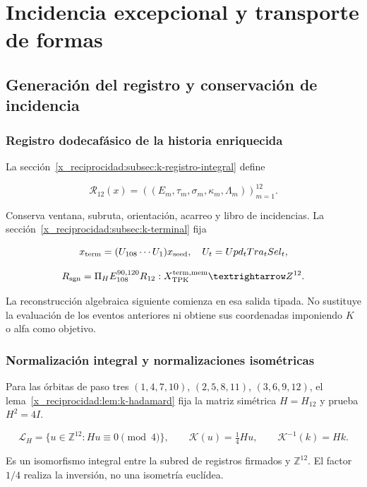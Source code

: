 \chapter{Incidencia excepcional y transporte de formas}
\label{x_reciprocidad:nuclear:4}
\section{Generación del registro y conservación de incidencia}

\subsection{Registro dodecafásico de la historia enriquecida}

La sección~\ref{x_reciprocidad:subsec:k-registro-integral} define

\[
\mathcal R_{12}(x)=((E_m,\tau_m,\sigma_m,\kappa_m,\Lambda_m))_{m=1}^{12}.
\]

Conserva ventana, subruta, orientación, acarreo y libro de incidencias. La sección~\ref{x_reciprocidad:subsec:k-terminal} fija

\[
x_{\rm term}=(\mathcal U_{108}\cdots\mathcal U_1)x_{\rm seed},
\quad \mathcal U_t=\mathsf{Upd}_t\mathsf{Tra}_t\mathsf{Sel}_t,
\]

\[
R_{\rm sgn}=\Pi_H\mathcal E_{108}^{90,120}\mathcal R_{12}:
\mathcal X_{\rm TPK}^{\rm term,mem}\to\mathbb Z^{12}.
\]

La reconstrucción algebraica siguiente comienza en esa salida tipada. No sustituye la evaluación de los eventos anteriores ni obtiene sus coordenadas imponiendo \(K\) o alfa como objetivo.

\subsection{Normalización integral y normalizaciones isométricas}

Para las órbitas de paso tres \((1,4,7,10)\), \((2,5,8,11)\), \((3,6,9,12)\), el lema~\ref{x_reciprocidad:lem:k-hadamard} fija la matriz simétrica \(H=H_{12}\) y prueba \(H^2=4I\).

\[
\mathcal L_H=\{u\in\mathbb Z^{12}:Hu\equiv0\pmod4\},
\qquad \mathscr K(u)=\tfrac14Hu,
\qquad \mathscr K^{-1}(k)=Hk.
\]

Es un isomorfismo integral entre la subred de registros firmados y \(\mathbb Z^{12}\). El factor \(1/4\) realiza la inversión, no una isometría euclídea.

